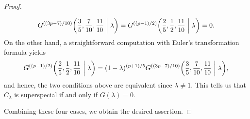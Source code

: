 \documentclass[10pt,a4paper]{amsart}
\begin{document}
\begin{proof}
\begin{itemize}
\[
    G^{((3p-7)/10)}\scalebox{0.95}{$\displaystyle\left(\frac{3}{5},\frac{7}{10},\frac{11}{10}\ \middle|\ \lambda\right)$} = G^{((p-1)/2)}\scalebox{0.95}{$\displaystyle\left(\frac{2}{5},\frac{1}{2},\frac{11}{10}\ \middle|\ \lambda\right)$} = 0.\vspace{-0.8mm}
\]
On the other hand, a straightforward computation with Euler’s transformation formula yields\vspace{-0.6mm}
\[
    G^{((p-1)/2)}\scalebox{0.95}{$\displaystyle\left(\frac{2}{5},\frac{1}{2},\frac{11}{10}\ \middle|\ \lambda\right)$} = (1-\lambda)^{(p+1)/5}G^{((3p-7)/10)}\scalebox{0.95}{$\displaystyle\left(\frac{3}{5},\frac{7}{10},\frac{11}{10}\ \middle|\ \lambda\right)$},\vspace{-0.9mm}
\]
and hence, the two conditions above are equivalent since $\lambda \neq 1$.
This tells us that $C_\lambda$ is superspecial if and only if $G(\lambda) = 0$.\vspace{-0.6mm}
\end{itemize}
Combining these four cases, we obtain the desired assertion.\vspace{-2mm}
\end{proof}
\end{document}
